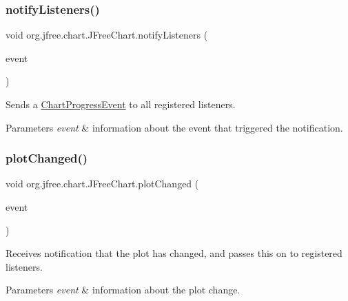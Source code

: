\subsubsection{\texorpdfstring{notify\+Listeners()}{notifyListeners()}\hspace{0.1cm}{\footnotesize\ttfamily [2/2]}}
{\footnotesize\ttfamily void org.\+jfree.\+chart.\+J\+Free\+Chart.\+notify\+Listeners (\begin{DoxyParamCaption}\item[{\mbox{\hyperlink{classorg_1_1jfree_1_1chart_1_1event_1_1_chart_progress_event}{Chart\+Progress\+Event}}}]{event }\end{DoxyParamCaption})\hspace{0.3cm}{\ttfamily [protected]}}

Sends a \mbox{\hyperlink{}{Chart\+Progress\+Event}} to all registered listeners.


\begin{DoxyParams}{Parameters}
{\em event} & information about the event that triggered the notification. \\
\hline
\end{DoxyParams}
\mbox{\label{classorg_1_1jfree_1_1chart_1_1_j_free_chart_a179c3ec3d9623b1534f1f6ec466c64ed}} 
\subsubsection{\texorpdfstring{plot\+Changed()}{plotChanged()}}
{\footnotesize\ttfamily void org.\+jfree.\+chart.\+J\+Free\+Chart.\+plot\+Changed (\begin{DoxyParamCaption}\item[{\mbox{\hyperlink{classorg_1_1jfree_1_1chart_1_1event_1_1_plot_change_event}{Plot\+Change\+Event}}}]{event }\end{DoxyParamCaption})}

Receives notification that the plot has changed, and passes this on to registered listeners.


\begin{DoxyParams}{Parameters}
{\em event} & information about the plot change. \\
\hline
\end{DoxyParams}


